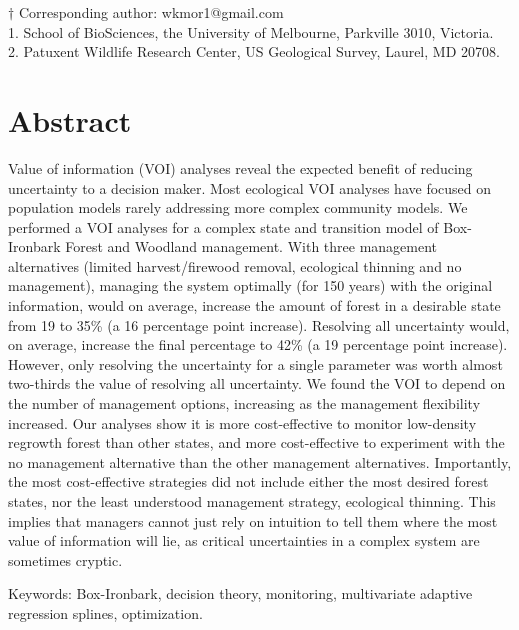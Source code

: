 $\dagger$ Corresponding author: wkmor1@gmail.com\\
1. School of BioSciences, the University of Melbourne, Parkville 3010, Victoria.\\
2. Patuxent Wildlife Research Center, US Geological Survey, Laurel, MD 20708.

\newpage

\section*{Abstract}\label{abstract}

Value of information (VOI) analyses reveal the expected benefit of reducing uncertainty to a decision maker. Most ecological VOI analyses have focused on population models rarely addressing more complex community models. We performed a VOI analyses for a complex state and transition model of Box-Ironbark Forest and Woodland management. With three management alternatives (limited harvest/firewood removal, ecological thinning and no management), managing the system optimally (for 150 years) with the original information, would on average, increase the amount of forest in a desirable state from 19 to 35\% (a 16 percentage point increase). Resolving all uncertainty would, on average, increase the final percentage to 42\% (a 19 percentage point increase). However, only resolving the uncertainty for a single parameter was worth almost two-thirds the value of resolving all uncertainty. We found the VOI to depend on the number of management options, increasing as the management flexibility increased. Our analyses show it is more cost-effective to monitor low-density regrowth forest than other states, and more cost-effective to experiment with the no management alternative than the other management alternatives. Importantly, the most cost-effective strategies did not include either the most desired forest states, nor the least understood management strategy, ecological thinning. This implies that managers cannot just rely on intuition to tell them where the most value of information will lie, as critical uncertainties in a complex system are sometimes cryptic.

Keywords: Box-Ironbark, decision theory, monitoring, multivariate adaptive regression splines, optimization.
